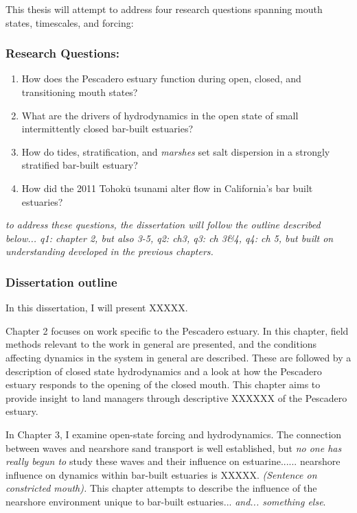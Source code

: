 This thesis will attempt to address four research questions spanning mouth states, timescales, and forcing: 


\subsubsection{Research Questions:}
\begin{enumerate}
	\item{How does the Pescadero estuary function during open, closed, and transitioning mouth states?}
	\item{What are the drivers of hydrodynamics in the open state of small intermittently closed bar-built estuaries?}
	\item{How do tides, stratification, and \emph{marshes} set salt dispersion in a strongly stratified bar-built estuary?}
	\item{How did the 2011 Tohok$\overline{\mathrm{u}}$ tsunami alter flow in California's bar built estuaries?}
\end{enumerate}

\emph{to address these questions, the dissertation will follow the outline described below... q1: chapter 2, but also 3-5, q2: ch3, q3: ch 3\&4, q4: ch 5, but built on understanding developed in the previous chapters.}


\subsubsection{Dissertation outline}

In this dissertation, I will present XXXXX.

Chapter 2 focuses on work specific to the Pescadero estuary. In this chapter, field methods relevant to the work in general are presented, and the conditions affecting dynamics in the system in general are described. These are followed by a description of closed state hydrodynamics and a look at how the Pescadero estuary responds to the opening of the closed mouth. This chapter aims to provide insight to land managers through descriptive XXXXXX of the Pescadero estuary.

In Chapter 3, I examine open-state forcing and hydrodynamics. The connection between waves and nearshore sand transport is well established, but \emph{no one has really begun to } study these waves and their influence on estuarine...... nearshore influence on dynamics within bar-built estuaries is XXXXX. \emph{(Sentence on constricted mouth).} This chapter attempts to describe the influence of the nearshore environment unique to bar-built estuaries... \emph{and... something else}. 

